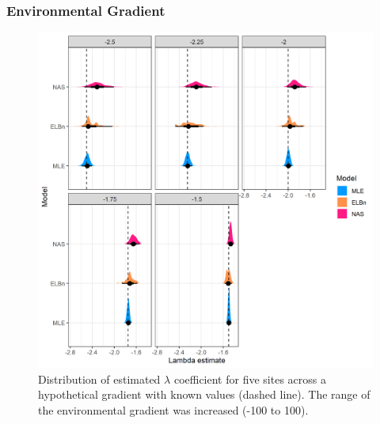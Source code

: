 \documentclass[
]{article}
\begin{document}
\newpage

\hypertarget{environmental-gradient}{%
\subsubsection{Environmental Gradient}\label{environmental-gradient}}

\begin{figure}
\centering
\includegraphics{figures/PLB_large_x_est_b_density.png}
\caption{Distribution of estimated \(\lambda\) coefficient for five
sites across a hypothetical gradient with known values (dashed line).
The range of the environmental gradient was increased (-100 to 100).}
\end{figure}

\newpage
\end{document}
